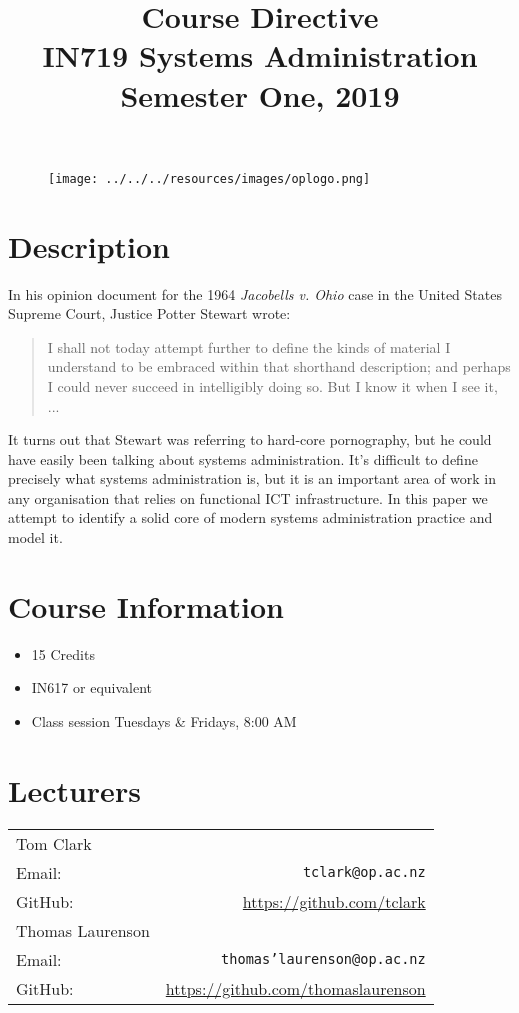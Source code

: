 \documentclass{article}
\begin{document}
\begin{figure}
\texttt{[image: ../../../resources/images/oplogo.png]}
\end{figure}

\title{Course Directive\\IN719 Systems Administration \\Semester One, 2019}
\date{}
\maketitle

\section*{Description}
In his opinion document for the 1964 \textit{Jacobells v. Ohio} case in the United States Supreme Court, Justice Potter Stewart wrote:
\begin{quote}
I shall not today attempt further to define the kinds of material I understand to be embraced within that shorthand description; and perhaps I could never succeed in intelligibly doing so. But I know it when I see it, ...
\end{quote}
It turns out that Stewart was referring to hard-core pornography, but he could have easily been talking about systems administration. It's difficult to define precisely what systems administration is, but it is an important area of work in any organisation that relies on functional ICT infrastructure. In this paper we attempt to identify a solid core of modern systems administration practice and model it.



\section*{Course Information}
\begin{itemize}
  \item 15 Credits
  \item IN617 or equivalent
  \item Class session Tuesdays \& Fridays, 8:00 AM
\end{itemize}

\section*{Lecturers}
\begin{tabular}{lr}

  Tom Clark &    \\
     Email: & \texttt{tclark@op.ac.nz} \\
     GitHub: & \url{https://github.com/tclark} \\
   Thomas Laurenson &    \\
     Email: & \texttt{thomas'laurenson@op.ac.nz} \\
     GitHub: & \url{https://github.com/thomaslaurenson} 
\end{tabular}
\end{document}
